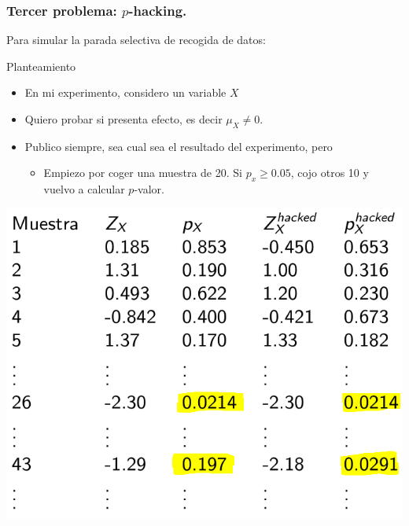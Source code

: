 \documentclass[9pt]{beamer}
\begin{document}
\begin{frame}
  \frametitle{Tercer problema: $p$-hacking.}
  Para simular la parada selectiva de recogida de datos:\\ 
  \begin{block}{Planteamiento}
    \begin{itemize}
    \item     En mi experimento, considero un variable $X$ 
    \item Quiero probar si presenta efecto, es decir $\mu_X \neq 0$.
    \item   Publico siempre, sea cual sea el resultado del
      experimento, pero
      \begin{itemize}
      \item Empiezo por coger una muestra de 20. Si  $p_x \geq 0.05$,
        cojo otros 10 y vuelvo a calcular $p$-valor.
      \end{itemize}
    \end{itemize}

  \end{block}
  \begin{center}
    \includegraphics[width=0.5\linewidth]{images/select_size-3} 
  \end{center}
\end{frame}
\end{document}
